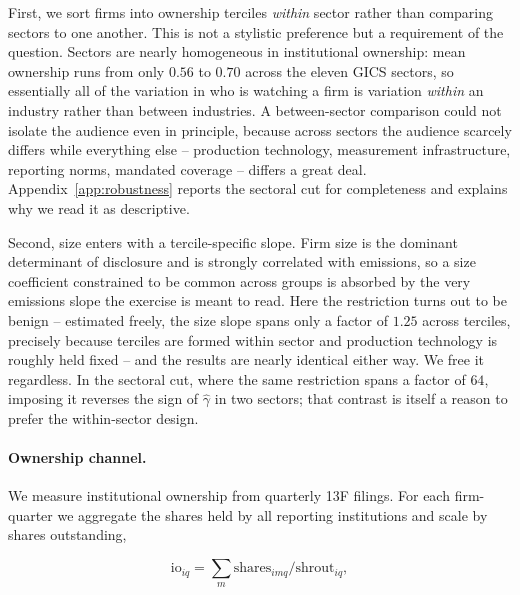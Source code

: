 \documentclass[a4paper,12pt]{article}
\begin{document}
First, we sort firms into ownership terciles \emph{within} sector rather than comparing sectors to one another. This is not a stylistic preference but a requirement of the question. Sectors are nearly homogeneous in institutional ownership: mean ownership runs from only $0.56$ to $0.70$ across the eleven GICS sectors, so essentially all of the variation in who is watching a firm is variation \emph{within} an industry rather than between industries. A between-sector comparison could not isolate the audience even in principle, because across sectors the audience scarcely differs while everything else -- production technology, measurement infrastructure, reporting norms, mandated coverage -- differs a great deal. Appendix~\ref{app:robustness} reports the sectoral cut for completeness and explains why we read it as descriptive.

Second, size enters with a tercile-specific slope. Firm size is the dominant determinant of disclosure and is strongly correlated with emissions, so a size coefficient constrained to be common across groups is absorbed by the very emissions slope the exercise is meant to read. Here the restriction turns out to be benign -- estimated freely, the size slope spans only a factor of $1.25$ across terciles, precisely because terciles are formed within sector and production technology is roughly held fixed -- and the results are nearly identical either way. We free it regardless. In the sectoral cut, where the same restriction spans a factor of $64$, imposing it reverses the sign of $\hat\gamma$ in two sectors; that contrast is itself a reason to prefer the within-sector design.

\paragraph{Ownership channel.} We measure institutional ownership from quarterly
13F filings. For each firm-quarter we aggregate the shares held by all reporting
institutions and scale by shares outstanding, 

\begin{equation}
    \mathrm{io}_{iq} = \sum_m
\mathrm{shares}_{imq} / \mathrm{shrout}_{iq},
\end{equation} 
\end{document}
